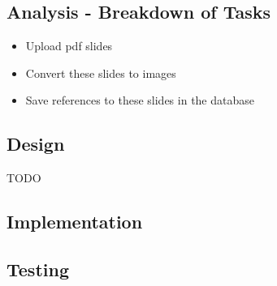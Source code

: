 \documentclass{article}
\begin{document}
\subsection{Analysis - Breakdown of Tasks}
\begin{itemize}
	\item Upload pdf slides
	\item Convert these slides to images
	\item Save references to these slides in the database
\end{itemize}
\subsection{Design}
TODO
\subsection{Implementation}
\subsection{Testing}
\newpage

%
%
\end{document}
